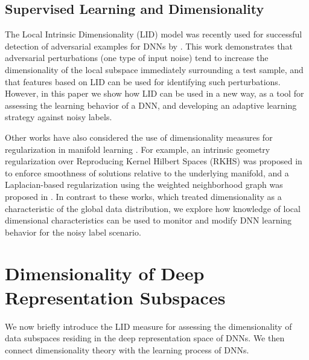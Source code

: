 \documentclass{article}
\begin{document}
\subsection{Supervised Learning and Dimensionality}

The Local Intrinsic Dimensionality (LID) model \cite{houle2017local1} was recently used for successful detection of adversarial examples for DNNs by \cite{ma2018characterizing}. This work demonstrates that adversarial perturbations (one type of input noise) tend to increase the dimensionality of the local subspace immediately surrounding a test sample, and that features based on LID can be used for identifying such perturbations.
However, in this paper we show how LID can be used in a new way, as a tool for assessing the learning behavior of a DNN, and developing an adaptive learning strategy against noisy labels.

Other works have also considered the use of dimensionality measures for regularization in manifold learning \cite{roweis2000nonlinear,belkin2004regularization,belkin2006manifold}. For example, an intrinsic geometry regularization over Reproducing Kernel Hilbert Spaces (RKHS) was proposed in \cite{belkin2006manifold} to enforce smoothness of solutions relative to the underlying manifold, and a Laplacian-based regularization using the weighted neighborhood graph was proposed in \cite{belkin2004regularization}. In contrast to these works, which treated dimensionality as a characteristic of the global data distribution, we explore how knowledge of local dimensional characteristics can be used to monitor and modify DNN learning behavior for the noisy label scenario. 




\section{Dimensionality of Deep Representation Subspaces}
We now briefly introduce the LID measure for assessing the dimensionality of data subspaces residing in the deep representation space of DNNs. We then connect dimensionality theory with the learning process of DNNs.
\end{document}
